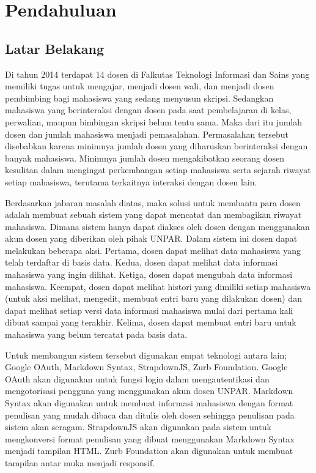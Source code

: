 \chapter{Pendahuluan}
\label{chap:pendahuluan}

\section{Latar Belakang}
\label{sec:latarbelakang}

Di tahun 2014 terdapat 14 dosen di Falkutas Teknologi Informasi dan Sains \cite{Ftis:2014} yang memiliki tugas untuk mengajar, menjadi dosen wali, dan menjadi dosen pembimbing bagi mahasiswa yang sedang menyusun skripsi. Sedangkan mahasiswa yang berinteraksi dengan dosen pada saat pembelajaran di kelas, perwalian, maupun bimbingan skripsi belum tentu sama. Maka dari itu jumlah dosen dan jumlah mahasiswa menjadi pemasalahan. Permasalahan tersebut disebabkan karena minimnya jumlah dosen yang diharuskan berinteraksi dengan banyak mahasiswa. Minimnya jumlah dosen mengakibatkan seorang dosen kesulitan dalam mengingat perkembangan setiap mahasiswa serta sejarah riwayat setiap mahasiswa, terutama terkaitnya interaksi dengan dosen lain.

Berdasarkan jabaran masalah diatas, maka solusi untuk membantu para dosen adalah membuat sebuah sistem yang dapat mencatat dan membagikan riwayat mahasiswa. Dimana sistem hanya dapat diakses oleh dosen dengan menggunakan akun dosen yang diberikan oleh pihak UNPAR. Dalam sistem ini dosen dapat melakukan beberapa aksi. Pertama, dosen dapat melihat data mahasiswa yang telah terdaftar di basis data. Kedua, dosen dapat melihat data informasi mahasiswa yang ingin dilihat. Ketiga, dosen dapat mengubah data informasi mahasiswa. Keempat, dosen dapat melihat histori yang dimiliki setiap mahasiswa (untuk aksi melihat, mengedit, membuat entri baru yang dilakukan dosen) dan dapat melihat setiap versi data informasi mahasiswa mulai dari pertama kali dibuat sampai yang terakhir. Kelima, dosen dapat membuat entri baru untuk mahasiswa yang belum tercatat pada basis data. 

Untuk membangun sistem tersebut digunakan empat teknologi antara lain; Google OAuth, Markdown Syntax, StrapdownJS, Zurb Foundation. Google OAuth akan digunakan untuk fungsi login dalam mengautentikasi dan mengotorisasi pengguna yang menggunakan akun dosen UNPAR. Markdown Syntax akan digunakan untuk membuat informasi mahasiswa dengan format penulisan yang mudah dibaca dan ditulis oleh dosen sehingga penulisan pada sistem akan seragam. StrapdownJS akan digunakan pada sistem untuk mengkonversi format penulisan yang dibuat menggunakan Markdown Syntax menjadi tampilan HTML. Zurb Foundation akan digunakan untuk membuat tampilan antar muka menjadi responsif.

